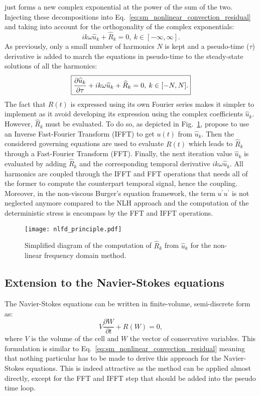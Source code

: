 just forms a new complex exponential at the power of the sum of the
two.
Injecting these decompositions into 
Eq.~\eqref{eq:sm_nonlinear_convection_residual} and taking into account
for the orthogonality of the complex exponentials:
\begin{equation}
	i k \omega \widehat{u}_k + \widehat{R}_k = 0, \: k \in [-\infty, \infty].
\end{equation}
As previously, only a small number of harmonics $N$ is kept and 
a pseudo-time ($\tau$) derivative is added to march the equations
in pseudo-time to the steady-state solutions of all the harmonics:
\begin{equation}
	\fbox{$
	\displaystyle \frac{\partial \widehat{u}_k}{\partial \tau} + 
	i k \omega \widehat{u}_k + \widehat{R}_k = 0, \: k \in [-N, N].
	$}
	\label{eq:sm_nlfd_subset_eq}
\end{equation}
The fact that $R(t)$ is expressed using its own Fourier series 
makes it simpler to implement 
as it avoid developing its expression using 
the complex coefficients $\widehat{u}_k$. 
However, $\widehat{R}_k$ must be evaluated. To do so, as depicted
in Fig.~\ref{fig:nlfd_principle}, \citet{McMullen2001}
propose to use an Inverse Fast-Fourier Transform (IFFT) to get
$u(t)$ from $\widehat{u}_k$. Then the considered governing equations
are used to evaluate $R(t)$ which leads to $\widehat{R}_k$
through a Fast-Fourier Transform (FFT). Finally, the next iteration value 
$\widehat{u}_k$
is evaluated by adding $\widehat{R}_k$ and 
the corresponding temporal derivative $i k \omega \widehat{u}_k$. All
harmonics are coupled through the IFFT and FFT operations
that needs all of the former to compute the counterpart temporal signal,
hence the coupling. Moreover, 
in the non-viscous Burger's equation framework, 
the term $u^\prime u^\prime$ is not neglected anymore compared to the
NLH approach and the computation of the deterministic stress is encompass
by the FFT and IFFT operations.
\begin{figure}[htbp]
  \centering
  \texttt{[image: nlfd\_principle.pdf]}
  \caption{Simplified diagram of the computation of $\widehat{R}_k$ from $\widehat{u}_k$
  for the non-linear frequency domain method.}
  \label{fig:nlfd_principle}
\end{figure}

\subsection{Extension to the Navier-Stokes equations}
The Navier-Stokes equations can be written in finite-volume,
semi-discrete form as:
\begin{equation}
	V \frac{\partial W}{\partial t} + R(W) = 0,
	\label{eq:navier_stokes_fv_sd}
\end{equation}
where $V$ is the volume of the cell and $W$
the vector of conservative variables.
This formulation is similar to
Eq.~\eqref{eq:sm_nonlinear_convection_residual} meaning that
nothing particular has to be made to derive this approach for
the Navier-Stokes equations. This is indeed attractive as the
method can be applied almost directly, except for the FFT and IFFT
step that should be added into the pseudo time loop.

